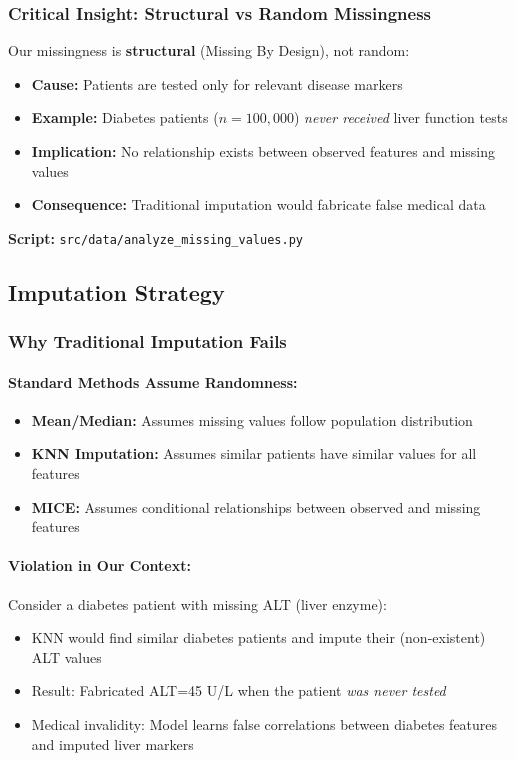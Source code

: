 \documentclass[12pt,a4paper]{article}
\begin{document}
\subsubsection{Critical Insight: Structural vs Random Missingness}
Our missingness is \textbf{structural} (Missing By Design), not random:

\begin{itemize}
    \item \textbf{Cause:} Patients are tested only for relevant disease markers
    \item \textbf{Example:} Diabetes patients ($n=100,000$) \textit{never received} liver function tests
    \item \textbf{Implication:} No relationship exists between observed features and missing values
    \item \textbf{Consequence:} Traditional imputation would fabricate false medical data
\end{itemize}

\textbf{Script:} \texttt{src/data/analyze\_missing\_values.py}

\subsection{Imputation Strategy}

\subsubsection{Why Traditional Imputation Fails}

\paragraph{Standard Methods Assume Randomness:}
\begin{itemize}
    \item \textbf{Mean/Median:} Assumes missing values follow population distribution
    \item \textbf{KNN Imputation:} Assumes similar patients have similar values for all features
    \item \textbf{MICE:} Assumes conditional relationships between observed and missing features
\end{itemize}

\paragraph{Violation in Our Context:}
Consider a diabetes patient with missing ALT (liver enzyme):
\begin{itemize}
    \item KNN would find similar diabetes patients and impute their (non-existent) ALT values
    \item Result: Fabricated ALT=45 U/L when the patient \textit{was never tested}
    \item Medical invalidity: Model learns false correlations between diabetes features and imputed liver markers
\end{itemize}
\end{document}
